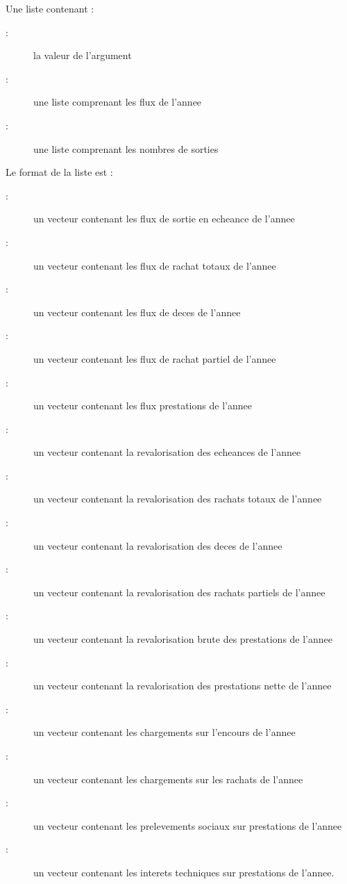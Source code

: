 \documentclass[a4paper]{book}
\begin{document}
%
\begin{Value}
Une liste contenant :
\begin{description}

\item[ : ] la valeur de l'argument 
\item[ : ] une liste comprenant les flux de l'annee
\item[ : ] une liste comprenant les nombres de sorties

\end{description}


Le format de la liste  est :
\begin{description}

\item[ : ] un vecteur contenant les flux de sortie en echeance de l'annee
\item[ : ] un vecteur contenant les flux de rachat totaux de l'annee
\item[ : ] un vecteur contenant les flux de deces de l'annee
\item[ : ] un vecteur contenant les flux de rachat partiel de l'annee
\item[ : ] un vecteur contenant les flux prestations de l'annee
\item[ : ] un vecteur contenant la revalorisation des echeances de l'annee
\item[ : ] un vecteur contenant la revalorisation des rachats totaux de l'annee
\item[ : ] un vecteur contenant la revalorisation des deces de l'annee
\item[ : ] un vecteur contenant la revalorisation des rachats partiels de l'annee
\item[ : ] un vecteur contenant la revalorisation brute des prestations de l'annee
\item[ : ] un vecteur contenant la revalorisation des prestations nette de l'annee
\item[ : ] un vecteur contenant les chargements sur l'encours de l'annee
\item[ : ] un vecteur contenant les chargements sur les rachats de l'annee
\item[ : ] un vecteur contenant les prelevements sociaux sur prestations de l'annee
\item[ : ] un vecteur contenant les interets techniques sur prestations de l'annee.


\end{description}
\end{Value}
\end{document}
